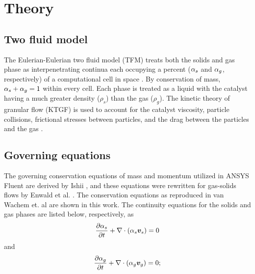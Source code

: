 \section*{Theory}
\subsection*{Two fluid model}
The Eulerian-Eulerian two fluid model (TFM) treats both the solids and gas phase as interpenetrating continua each occupying a percent ($\alpha_{s}$ and $\alpha_{g}$, respectively) of a computational cell in space \cite{gidaspow94}. By conservation of mass, $\alpha_{s}+\alpha_{g}=1$ within every cell. Each phase is treated as a liquid with the catalyst having a much greater density ($\rho_s$) than the gas ($\rho_g$). The kinetic theory of granular flow (KTGF) is used to account for the catalyst viscosity, particle collisions, frictional stresses between particles, and the drag between the particles and the gas \cite{chapman70,jenkins83,lun84}.
%
%

\subsection*{Governing equations}
The governing conservation equations of mass and momentum utilized in ANSYS Fluent are derived by Ishii \cite{ishii75}, and these equations were rewritten for gas-solids flows by Enwald et al. \cite{enwald96}. The conservation equations as reproduced in van Wachem et. al \cite{vanwachem01} are shown in this work. The continuity equations for the solids and gas phases are listed below, respectively, as
\begin{equation}\label{eq:mass_s}
	\frac{\partial\alpha_{s}}{\partial t}
	+\nabla\cdot(\alpha_{s} \boldsymbol{v}_{s})
	=0
\end{equation}
and
\begin{equation}\label{eq:mass_g}
	\frac{\partial\alpha_{g}}{\partial t}
	+\nabla\cdot(\alpha_{g} \boldsymbol{v}_{g})
	=0;
\end{equation}

